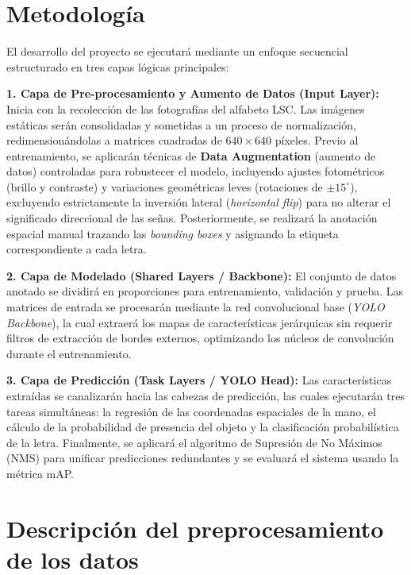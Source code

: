 \documentclass[12pt,letterpaper]{article}
\begin{document}
\section{Metodología}
El desarrollo del proyecto se ejecutará mediante un enfoque secuencial estructurado en tres capas lógicas principales:

\textbf{1. Capa de Pre-procesamiento y Aumento de Datos (Input Layer):}
Inicia con la recolección de las fotografías del alfabeto LSC. Las imágenes estáticas serán consolidadas y sometidas a un proceso de normalización, redimensionándolas a matrices cuadradas de $640 \times 640$ píxeles. Previo al entrenamiento, se aplicarán técnicas de \textbf{Data Augmentation} (aumento de datos) controladas para robustecer el modelo, incluyendo ajustes fotométricos (brillo y contraste) y variaciones geométricas leves (rotaciones de $\pm 15^\circ$), excluyendo estrictamente la inversión lateral (\textit{horizontal flip}) para no alterar el significado direccional de las señas. Posteriormente, se realizará la anotación espacial manual trazando las \textit{bounding boxes} y asignando la etiqueta correspondiente a cada letra. 

\textbf{2. Capa de Modelado (Shared Layers / Backbone):}
El conjunto de datos anotado se dividirá en proporciones para entrenamiento, validación y prueba. Las matrices de entrada se procesarán mediante la red convolucional base (\textit{YOLO Backbone}), la cual extraerá los mapas de características jerárquicas sin requerir filtros de extracción de bordes externos, optimizando los núcleos de convolución durante el entrenamiento.

\textbf{3. Capa de Predicción (Task Layers / YOLO Head):}
Las características extraídas se canalizarán hacia las cabezas de predicción, las cuales ejecutarán tres tareas simultáneas: la regresión de las coordenadas espaciales de la mano, el cálculo de la probabilidad de presencia del objeto y la clasificación probabilística de la letra. Finalmente, se aplicará el algoritmo de Supresión de No Máximos (NMS) para unificar predicciones redundantes y se evaluará el sistema usando la métrica mAP.

\vspace{0.5cm}

\section{Descripción del preprocesamiento de los datos}
\end{document}
